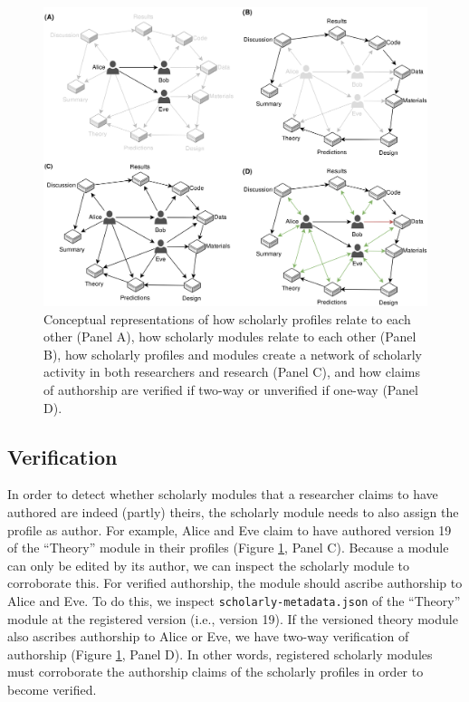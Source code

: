 \documentclass[a5paper]{book}
\begin{document}
\begin{figure}[h]

{\centering \includegraphics[width=1\linewidth]{assets/figures/datcom-fig4} 

}

\caption{Conceptual representations of how scholarly profiles relate to each other (Panel A), how scholarly modules relate to each other (Panel B), how scholarly profiles and modules create a network of scholarly activity in both researchers and research (Panel C), and how claims of authorship are verified if two-way or unverified if one-way (Panel D).}\label{fig:datcom-fig4}
\end{figure}

\subsection{Verification}\label{verification}

In order to detect whether scholarly modules that a researcher claims to
have authored are indeed (partly) theirs, the scholarly module needs to
also assign the profile as author. For example, Alice and Eve claim to
have authored version 19 of the \enquote{Theory} module in their
profiles (Figure \ref{fig:datcom-fig4}, Panel C). Because a module can
only be edited by its author, we can inspect the scholarly module to
corroborate this. For verified authorship, the module should ascribe
authorship to Alice and Eve. To do this, we inspect
\texttt{scholarly-metadata.json} of the \enquote{Theory} module at the
registered version (i.e., version 19). If the versioned theory module
also ascribes authorship to Alice or Eve, we have two-way verification
of authorship (Figure \ref{fig:datcom-fig4}, Panel D). In other words,
registered scholarly modules must corroborate the authorship claims of
the scholarly profiles in order to become verified.
\end{document}
